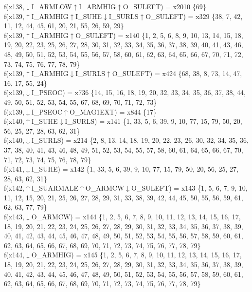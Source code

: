 f(x138,$\downarrow$I\_ARMLOW$\uparrow$I\_ARMHIG$\uparrow$O\_SULEFT) = x2010 \{69\} \\  
f(x139,$\uparrow$I\_ARMHIG$\uparrow$I\_SUHE$\downarrow$I\_SURLS$\uparrow$O\_SULEFT) = x329 \{38, 7, 42, 11, 12, 44, 45, 61, 20, 21, 55, 26, 59, 29\} \\  
f(x139,$\uparrow$I\_ARMHIG$\uparrow$O\_SULEFT) = x140 \{1, 2, 5, 6, 8, 9, 10, 13, 14, 15, 18, 19, 20, 22, 23, 25, 26, 27, 28, 30, 31, 32, 33, 34, 35, 36, 37, 38, 39, 40, 41, 43, 46, 48, 49, 50, 51, 52, 53, 54, 55, 56, 57, 58, 60, 61, 62, 63, 64, 65, 66, 67, 70, 71, 72, 73, 74, 75, 76, 77, 78, 79\} \\  
f(x139,$\uparrow$I\_ARMHIG$\downarrow$I\_SURLS$\uparrow$O\_SULEFT) = x424 \{68, 38, 8, 73, 14, 47, 16, 17, 55, 24\} \\  
f(x139,$\downarrow$I\_PSEOC) = x736 \{14, 15, 16, 18, 19, 20, 32, 33, 34, 35, 36, 37, 38, 44, 49, 50, 51, 52, 53, 54, 55, 67, 68, 69, 70, 71, 72, 73\} \\  
f(x139,$\downarrow$I\_PSEOC$\uparrow$O\_MAG1EXT) = x844 \{17\} \\  
f(x140,$\uparrow$I\_SUHE$\downarrow$I\_SURLS) = x141 \{1, 33, 5, 6, 39, 9, 10, 77, 15, 79, 50, 20, 56, 25, 27, 28, 63, 62, 31\} \\  
f(x140,$\downarrow$I\_SURLS) = x214 \{2, 8, 13, 14, 18, 19, 20, 22, 23, 26, 30, 32, 34, 35, 36, 37, 38, 40, 41, 43, 46, 48, 49, 51, 52, 53, 54, 55, 57, 58, 60, 61, 64, 65, 66, 67, 70, 71, 72, 73, 74, 75, 76, 78, 79\} \\  
f(x141,$\downarrow$I\_SUHE) = x142 \{1, 33, 5, 6, 39, 9, 10, 77, 15, 79, 50, 20, 56, 25, 27, 28, 63, 62, 31\} \\  
f(x142,$\uparrow$I\_SUARMALE$\uparrow$O\_ARMCW$\downarrow$O\_SULEFT) = x143 \{1, 5, 6, 7, 9, 10, 11, 12, 15, 20, 21, 25, 26, 27, 28, 29, 31, 33, 38, 39, 42, 44, 45, 50, 55, 56, 59, 61, 62, 63, 77, 79\} \\  
f(x143,$\downarrow$O\_ARMCW) = x144 \{1, 2, 5, 6, 7, 8, 9, 10, 11, 12, 13, 14, 15, 16, 17, 18, 19, 20, 21, 22, 23, 24, 25, 26, 27, 28, 29, 30, 31, 32, 33, 34, 35, 36, 37, 38, 39, 40, 41, 42, 43, 44, 45, 46, 47, 48, 49, 50, 51, 52, 53, 54, 55, 56, 57, 58, 59, 60, 61, 62, 63, 64, 65, 66, 67, 68, 69, 70, 71, 72, 73, 74, 75, 76, 77, 78, 79\} \\  
f(x144,$\downarrow$O\_ARMHIG) = x145 \{1, 2, 5, 6, 7, 8, 9, 10, 11, 12, 13, 14, 15, 16, 17, 18, 19, 20, 21, 22, 23, 24, 25, 26, 27, 28, 29, 30, 31, 32, 33, 34, 35, 36, 37, 38, 39, 40, 41, 42, 43, 44, 45, 46, 47, 48, 49, 50, 51, 52, 53, 54, 55, 56, 57, 58, 59, 60, 61, 62, 63, 64, 65, 66, 67, 68, 69, 70, 71, 72, 73, 74, 75, 76, 77, 78, 79\} \\  
